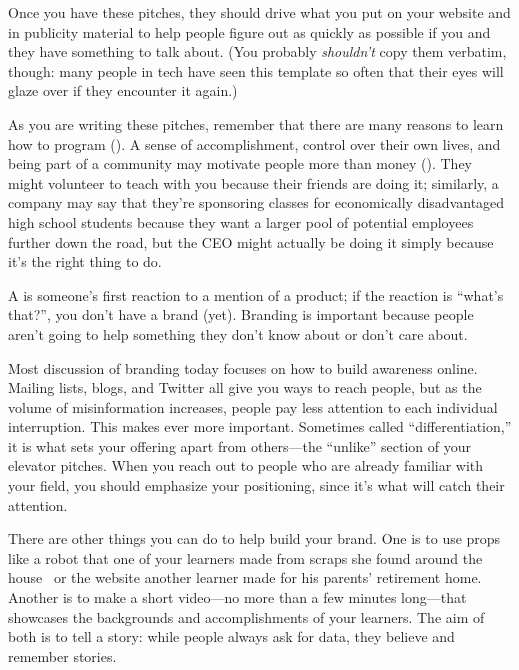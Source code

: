 Once you have these pitches,
they should drive what you put on your website and in publicity material
to help people figure out as quickly as possible
if you and they have something to talk about.
(You probably \emph{shouldn't} copy them verbatim,
though:
many people in tech have seen this template so often that
their eyes will glaze over if they encounter it again.)

As you are writing these pitches,
remember that there are many reasons to learn how to program
().
A sense of accomplishment,
control over their own lives,
and being part of a community may motivate people more than money
().
They might volunteer to teach with you because their friends are doing it;
similarly,
a company may say that they're sponsoring classes for economically disadvantaged high school students
because they want a larger pool of potential employees further down the road,
but the CEO might actually be doing it simply because it's the right thing to do.


A  is someone's first reaction to a mention of a product;
if the reaction is ``what's that?'',
you don't have a brand (yet).
Branding is important because
people aren't going to help something they don't know about or don't care about.

Most discussion of branding today focuses on
how to build awareness online.
Mailing lists,
blogs,
and Twitter all give you ways to reach people,
but as the volume of misinformation increases,
people pay less attention to each individual interruption.
This makes  ever more important.
Sometimes called ``differentiation,''
it is what sets your offering apart from others---the ``unlike'' section of your elevator pitches.
When you reach out to people who are already familiar with your field,
you should emphasize your positioning,
since it's what will catch their attention.

There are other things you can do to help build your brand.
One is to use props
like a robot that one of your learners made from scraps she found around the house~\cite{Schw2013}
or the website another learner made for his parents' retirement home.
Another is to make a short video---no more than a few minutes long---that showcases
the backgrounds and accomplishments of your learners.
The aim of both is to tell a story:
while people always ask for data,
they believe and remember stories.

